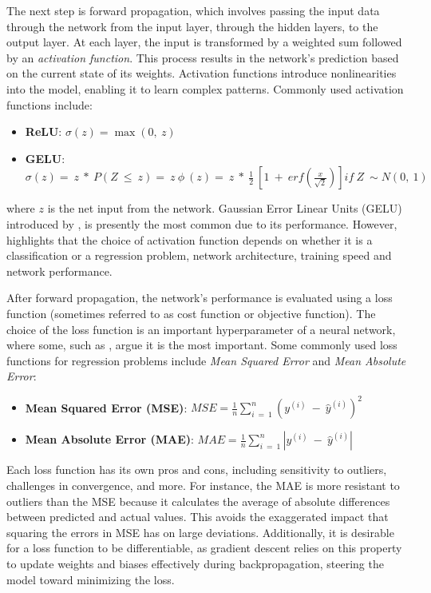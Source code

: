 \documentclass[12pt,a4paper]{article}
\begin{document}
The next step is forward propagation, which involves passing the input data through the network from the input layer, through the hidden layers, to the output layer. At each layer, the input is transformed by a weighted sum followed by an \textit{activation function}. This process results in the network's prediction based on the current state of its weights. Activation functions introduce nonlinearities into the model, enabling it to learn complex patterns. Commonly used activation functions include:

\begin{itemize}
  \item \textbf{ReLU}: $\sigma\left(z\right)=\max{\left(0,\ z\right)}$
  \item \textbf{GELU}: $\sigma\left(z\right)=\ z\ \ast\ P\left(Z\ \le\ z\right)=\ z\ \phi\ \left(z\right)=\ z\ \ast\ \frac{1}{2}\ \left[1\ +\ erf\left(\frac{x}{\sqrt2}\right)\right]
  if\ Z\ \sim N(0,\ 1)$
\end{itemize}

where $z$ is the net input from the network. Gaussian Error Linear Units (GELU) introduced by \cite{Hendrycks2016}, is presently the most common due to its performance. However, \cite{Raschka2017} highlights that the choice of activation function depends on whether it is a classification or a regression problem, network architecture, training speed and network performance.

After forward propagation, the network's performance is evaluated using a loss function (sometimes referred to as cost function or objective function). The choice of the loss function is an important hyperparameter of a neural network, where some, such as \cite{drager2022evaluating}, argue it is the most important. Some commonly used loss functions for regression problems include \textit{Mean Squared Error} and \textit{Mean Absolute Error}: 

\begin{itemize}
  \item \textbf{Mean Squared Error (MSE)}: $MSE=\frac{1}{n}\sum_{i\ =\ 1}^{n}\left(y^{\left(i\right)}\ -\ {\hat{y}}^{\left(i\right)}\right)^2$
  \item \textbf{Mean Absolute Error (MAE)}: $MAE=\frac{1}{n}\sum_{i\ =\ 1}^{n}\left|y^{\left(i\right)}\ -\ {\hat{y}}^{\left(i\right)}\right|$
\end{itemize}

Each loss function has its own pros and cons, including sensitivity to outliers, challenges in convergence, and more. For instance, the MAE is more resistant to outliers than the MSE because it calculates the average of absolute differences between predicted and actual values. This avoids the exaggerated impact that squaring the errors in MSE has on large deviations. Additionally, it is desirable for a loss function to be differentiable, as gradient descent relies on this property to update weights and biases effectively during backpropagation, steering the model toward minimizing the loss.
\end{document}
